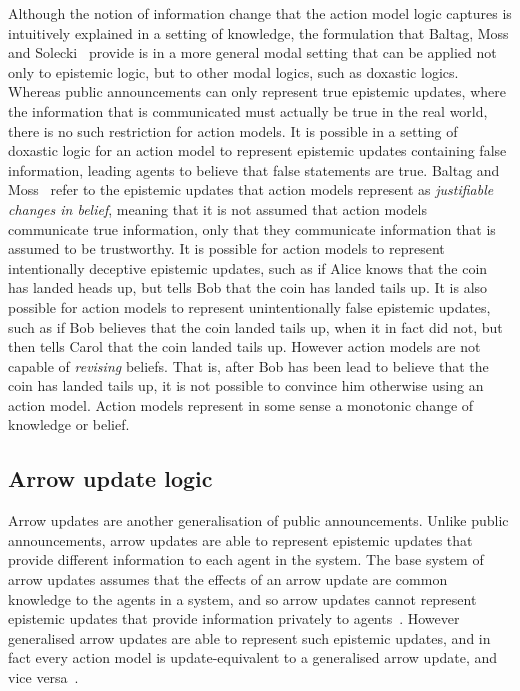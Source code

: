 Although the notion of information change that the action model logic captures is intuitively explained in a setting of knowledge, the formulation that Baltag, Moss and Solecki~\cite{baltag:1998} provide is in a more general modal setting that can be applied not only to epistemic logic, but to other modal logics, such as doxastic logics.
Whereas public announcements can only represent true epistemic updates, where the information that is communicated must actually be true in the real world, there is no such restriction for action models.
It is possible in a setting of doxastic logic for an action model to represent epistemic updates containing false information, leading agents to believe that false statements are true.
Baltag and Moss~\cite{baltag:2004} refer to the epistemic updates that action models represent as {\em justifiable changes in belief}, meaning that it is not assumed that action models communicate true information, only that they communicate information that is assumed to be trustworthy.
It is possible for action models to represent intentionally deceptive epistemic updates, such as if Alice knows that the coin has landed heads up, but tells Bob that the coin has landed tails up.
It is also possible for action models to represent unintentionally false epistemic updates, such as if Bob believes that the coin landed tails up, when it in fact did not, but then tells Carol that the coin landed tails up. 
However action models are not capable of {\em revising} beliefs.
That is, after Bob has been lead to believe that the coin has landed tails up, it is not possible to convince him otherwise using an action model.
Action models represent in some sense a monotonic change of knowledge or belief.

\subsection{Arrow update logic}

Arrow updates are another generalisation of public announcements.
Unlike public announcements, arrow updates are able to represent epistemic updates that provide different information to each agent in the system.
The base system of arrow updates assumes that the effects of an arrow update are common knowledge to the agents in a system, and so arrow updates cannot represent epistemic updates that provide information privately to agents~\cite{kooi:2011a}.
However generalised arrow updates are able to represent such epistemic updates, and in fact every action model is update-equivalent to a generalised arrow update, and vice versa~\cite{kooi:2011b}.


